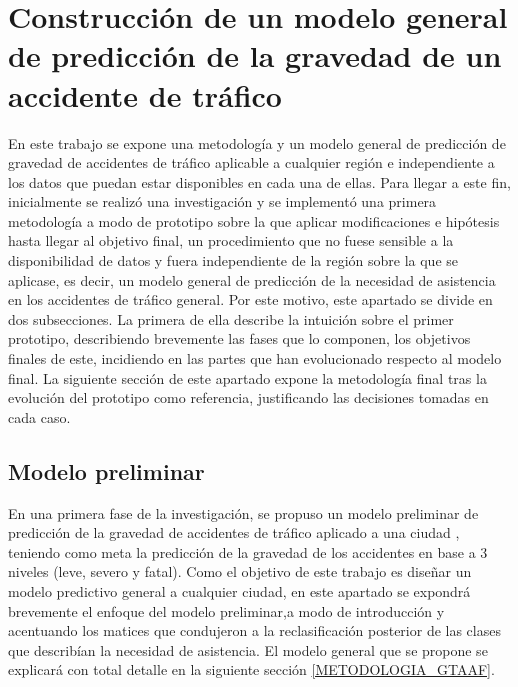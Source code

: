 

\chapter{Construcción de un modelo general de predicción de la gravedad de un accidente de tráfico}

En este trabajo se expone una metodología y un modelo general de predicción de gravedad de accidentes de tráfico aplicable a cualquier región e independiente a los datos que puedan estar disponibles en cada una de ellas. Para llegar a este fin, inicialmente se realizó una investigación y se implementó una primera metodología a modo de prototipo sobre la que aplicar modificaciones e hipótesis hasta llegar al objetivo final, un procedimiento que no fuese sensible a la disponibilidad de datos y fuera independiente de la región sobre la que se aplicase, es decir, un modelo general de predicción de la necesidad de asistencia en los accidentes de tráfico general. Por este motivo, este apartado se divide en dos subsecciones. La primera de ella describe la intuición sobre el primer prototipo, describiendo brevemente las fases que lo componen, los objetivos finales de este, incidiendo en las partes que han evolucionado respecto al modelo final. La siguiente sección de este apartado expone la metodología final tras la evolución del prototipo como referencia, justificando las decisiones tomadas en cada caso.


\section{Modelo preliminar}
\label{METODOLOGIA_MODELO_PRELIMINAR}



En una primera fase de la investigación, se propuso un modelo preliminar de predicción de la gravedad de accidentes de tráfico aplicado a una ciudad \cite{PEREZSALA2023113245}, teniendo como meta la predicción de la gravedad de los accidentes en base a 3 niveles (leve, severo y fatal). Como el objetivo de este trabajo es diseñar un modelo predictivo general a cualquier ciudad, en este apartado se expondrá brevemente el enfoque del modelo preliminar,a modo de introducción y acentuando los matices que condujeron a la reclasificación posterior de las clases que describían la necesidad de asistencia. El modelo general que se propone se explicará con total detalle en la siguiente sección \ref{METODOLOGIA_GTAAF}.

